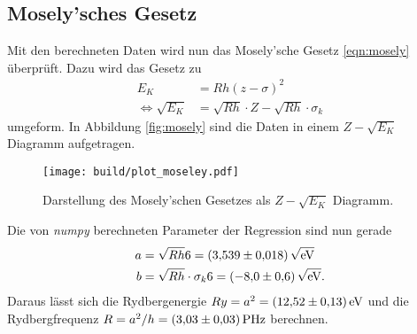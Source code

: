 

\subsection{Mosely'sches Gesetz}
\label{sec:Mosely}
Mit den berechneten Daten wird nun das Mosely'sche Gesetz \eqref{eqn:mosely} überprüft. Dazu wird das Gesetz zu 
\begin{align*}
    E_K &= R h (z - \sigma)^2 \\
    \Leftrightarrow\sqrt{E_K} &= \sqrt{R h}\cdot Z - \sqrt{R h}\cdot\sigma_k
\end{align*} 
umgeform. In Abbildung \ref{fig:mosely} sind die Daten in einem $Z-\sqrt{E_K}$ Diagramm aufgetragen. 
\begin{figure}
    \centering
    \texttt{[image: build/plot\_moseley.pdf]}
    \caption{Darstellung des Mosely'schen Gesetzes als $Z-\sqrt{E_K}$ Diagramm.}
    \label{fig:moseley_regression}
\end{figure}
Die von \textit{numpy} \cite{numpy} berechneten Parameter der Regression sind nun gerade 
\begin{align*}
    a&=\sqrt{R h}              6=\SI{3.539\pm 0.018}{\sqrt{\electronvolt}}\\
    b&=\sqrt{R h}\cdot\sigma_k 6=\SI{-8.0 \pm 0.6}{\sqrt{\electronvolt}}.
\end{align*}
Daraus lässt sich die Rydbergenergie $Ry=a^2=\SI{12.52\pm 0.13}{\electronvolt}$ und die Rydbergfrequenz $R=a^2/h=\SI{3.03\pm 0.03}{\peta\hertz}$
berechnen. 